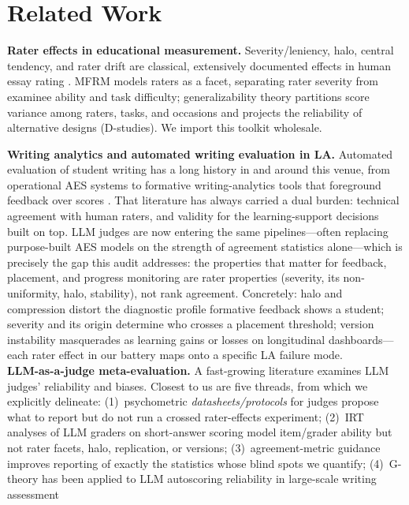 \documentclass[fleqn,10pt]{JLA_article}
\begin{document}
\section{Related Work}
\label{sec:related}
\textbf{Rater effects in educational measurement.} Severity/leniency, halo, central tendency, and
rater drift are classical, extensively documented effects in human essay rating
\cite{saal1980,engelhard1994,myford2003,myford2004,eckes2015}. MFRM \cite{linacre1989} models raters as a
facet, separating rater severity from examinee ability and task difficulty; generalizability
theory \cite{brennan2001} partitions score variance among raters, tasks, and occasions and
projects the reliability of alternative designs (D-studies). We import this toolkit wholesale.

\textbf{Writing analytics and automated writing evaluation in LA.} Automated evaluation of student writing has a long history in and around this venue, from operational AES systems \cite{attali2006,shermis2013,ramesh2022} to formative writing-analytics tools that foreground feedback over scores \cite{gibson2017,knight2020}. That literature has always carried a dual burden: technical agreement with human raters, and validity for the learning-support decisions built on top. LLM judges are now entering the same pipelines---often replacing purpose-built AES models on the strength of agreement statistics alone---which is precisely the gap this audit addresses: the properties that matter for feedback, placement, and progress monitoring are rater properties (severity, its non-uniformity, halo, stability), not rank agreement. Concretely: halo and compression distort the diagnostic profile formative feedback shows a student; severity and its origin determine who crosses a placement threshold; version instability masquerades as learning gains or losses on longitudinal dashboards---each rater effect in our battery maps onto a specific LA failure mode.\\[4pt]
\textbf{LLM-as-a-judge meta-evaluation.} A fast-growing literature examines LLM judges'
reliability and biases. Closest to us are five threads, from which we explicitly delineate:
(1)~psychometric \emph{datasheets/protocols} for judges \cite{judgedatasheet2026} propose what to
report but do not run a crossed rater-effects experiment; (2)~IRT analyses of LLM graders on
short-answer scoring \cite{irtasag2026} model item/grader ability but not rater facets, halo,
replication, or versions; (3)~agreement-metric guidance \cite{agreementmetrics2026} improves
reporting of exactly the statistics whose blind spots we quantify; (4)~G-theory has been applied to LLM autoscoring reliability in large-scale writing assessment
\end{document}
